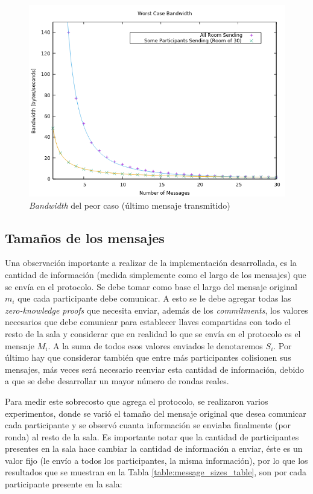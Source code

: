 \begin{figure}[H]
  \centering
    \includegraphics[scale=0.7]{logs/bandwidth.png}
  \caption{\emph{Bandwidth} del peor caso (último mensaje transmitido)}
  \label{fig:bandwidth}
\end{figure}

\subsection{Tamaños de los mensajes}

Una observación importante a realizar de la implementación desarrollada, es la 
cantidad de información (medida simplemente como el largo de los mensajes) que 
se envía en el protocolo. Se debe tomar como base el largo del mensaje 
original $m_i$ que cada participante debe comunicar. A esto se le debe agregar 
todas las \emph{zero-knowledge proofs} que necesita enviar, además de los 
\emph{commitments}, los valores necesarios que debe comunicar para establecer 
llaves compartidas con todo el resto de la sala y considerar que en realidad 
lo que se envía en el protocolo es el mensaje $M_i$. A la suma de todos esos 
valores enviados le denotaremos $S_i$. Por último hay que considerar también 
que entre más participantes colisionen sus mensajes, más veces será necesario 
reenviar esta cantidad de información, debido a que se debe desarrollar un 
mayor número de rondas reales.

Para medir este sobrecosto que agrega el protocolo, se realizaron varios 
experimentos, donde se varió el tamaño del mensaje original que desea 
comunicar cada participante y se observó cuanta información se enviaba 
finalmente (por ronda) al resto de la sala. Es importante notar que la 
cantidad de participantes presentes en la sala hace cambiar la cantidad de 
información a enviar, éste es un valor fijo (le envío a todos los 
participantes, la misma información), por lo que los resultados que se 
muestran en la Tabla \ref{table:message_sizes_table}, son por cada 
participante presente en la sala:

